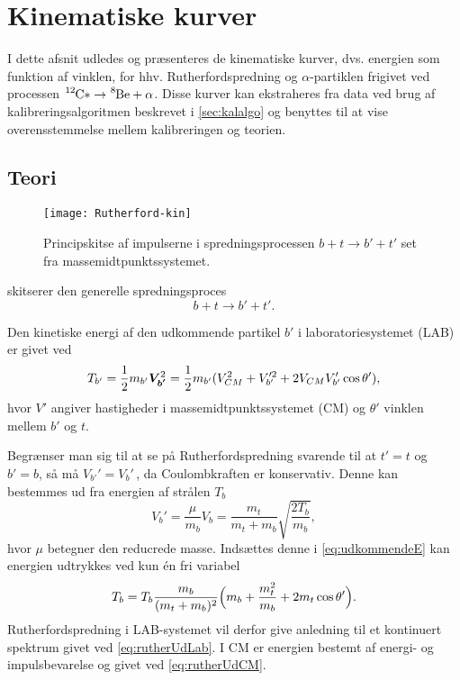 \chapter{Kinematiske kurver}
\label{cha:rutherford}

I dette afsnit udledes og præsenteres de kinematiske kurver, dvs. energien som funktion af vinklen,
for hhv. Rutherfordspredning og $\alpha$-partiklen frigivet ved processen
$\Carb* \rightarrow \Be + \alpha$. Disse kurver kan ekstraheres fra data ved brug af
kalibreringsalgoritmen beskrevet i \cref{sec:kalalgo} og benyttes til at vise overensstemmelse
mellem kalibreringen og teorien.

\section{Teori}
\label{sec:teori}

\begin{figure}[b]
  \centering
  \texttt{[image: Rutherford-kin]}
  \caption{Principskitse af impulserne i spredningsprocessen $b + t \rightarrow b' + t'$ set fra massemidtpunktssystemet.}
  \label{fig:ruther-kin}
\end{figure}

 skitserer den generelle spredningsproces
\begin{equation}
  \label{eq:spredning}
  b + t \rightarrow b' + t'.
\end{equation}

Den kinetiske energi af den udkommende partikel $b'$ i laboratoriesystemet (LAB) er givet ved
\begin{equation}
  \label{eq:udkommendeE}
  T_{b'} = \frac{1}{2}m_{b'} \bm{V_{b'}}^{2} = \frac{1}{2}m_{b'}(V_{CM}^{2} + V_{b'}'^{2} +
  2V_{CM}V_{b'}'\cos \theta' ),
\end{equation}
hvor $V'$ angiver hastigheder i massemidtpunktssystemet (CM) og $\theta'$ vinklen mellem $b'$ og $t$.

Begrænser man sig til at se på Rutherfordspredning svarende til at $t' = t$ og $b' = b$, så må
$V_{b'}' = V_{b}'\,$, da Coulombkraften er konservativ. Denne kan bestemmes ud fra energien af strålen
$T_{b}$
\begin{equation}
  \label{eq:rutherUdCM}
  V_{b}' = \frac{\mu}{m_{b}}V_{b} = \frac{m_{t}}{m_{t}+m_{b}} \sqrt{\frac{2T_{b}}{m_{b}}},
\end{equation}
hvor $\mu$ betegner den reducrede masse. Indsættes denne i \cref{eq:udkommendeE} kan energien
udtrykkes ved kun én fri variabel
\begin{equation}
  \label{eq:rutherUdLab}
  T_{b} = T_{b} \frac{m_{b}}{(m_{t}+m_{b})^{2}} \Bigl(m_{b} + \frac{m_{t}^{2}}{m_{b}} + 2m_{t}\cos \theta'\Bigr).
\end{equation}
Rutherfordspredning i LAB-systemet vil derfor give anledning til et kontinuert spektrum givet ved
\cref{eq:rutherUdLab}. I CM er energien bestemt af energi- og impulsbevarelse og givet ved
\cref{eq:rutherUdCM}.

